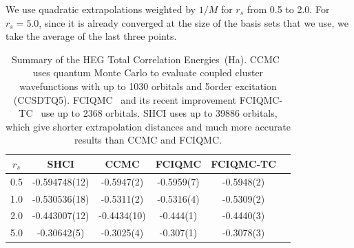 We use quadratic extrapolations weighted by $1/M$ for $r_s$ from 0.5 to 2.0.
For $r_s=5.0$, since it is already converged at the size of the basis sets that we use, we take the average of the last three points.
\begin{table}
\caption{Summary of the HEG Total Correlation Energies~(Ha).
CCMC~\cite{neufeld2017study} uses quantum Monte Carlo to evaluate coupled cluster wavefunctions with up to 1030 orbitals and 5\nth order excitation (CCSDTQ5).
FCIQMC~\cite{shepherd2012full} and its recent improvement FCIQMC-TC~\cite{luo2018combining} use up to 2368 orbitals.
SHCI uses up to 39886 orbitals, which give shorter extrapolation distances and much more accurate results than CCMC and FCIQMC.
}
\label{tab:results}
\begin{center}
\begin{tabular}{| c || c || c | c | c | c |}
 \hline
 $r_s$ & SHCI & CCMC & FCIQMC & FCIQMC-TC \\
 \hline\hline
 0.5 & -0.594748(12) & -0.5947(2) & -0.5959(7) & -0.5948(2)\\
 \hline
 1.0 & -0.530536(18) & -0.5311(2) & -0.5316(4) & -0.5309(2)\\
 \hline
 2.0 & -0.443007(12) & -0.4434(10) & -0.444(1) & -0.4440(3)\\
 \hline
 5.0 & -0.30642(5) & -0.3025(4) & -0.307(1) & -0.3078(3)\\
 \hline
\end{tabular}
\end{center}
\end{table}

